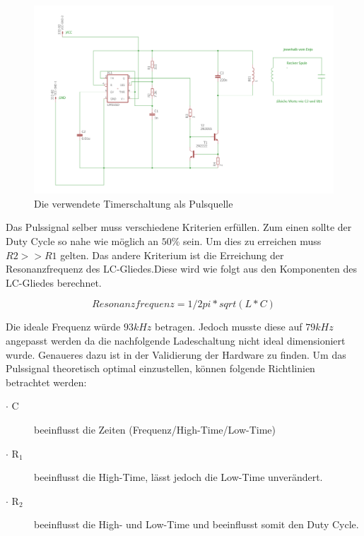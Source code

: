\begin{figure}[H]
	\begin{center}
		\includegraphics[width=\textwidth]{data/Tranceiver.png}
		\caption[Ne555]{Die verwendete Timerschaltung als Pulsquelle} %
		\label{fig:Tranceiver-Schaltung}
	\end{center}
\end{figure}
 
Das Pulssignal selber muss verschiedene Kriterien erfüllen. Zum einen sollte der Duty Cycle so nahe wie möglich an $50\%$ sein. Um dies zu erreichen muss $R2 >> R1$ gelten. Das andere Kriterium ist die Erreichung der Resonanzfrequenz des LC-Gliedes.Diese wird wie folgt aus den Komponenten des LC-Gliedes berechnet.

\begin{equation}\label{eq:Resonanz}
Resonanzfrequenz=1/2pi*sqrt(L*C)
\end{equation}

Die ideale Frequenz würde $93kHz$ betragen. Jedoch musste diese auf $79kHz$ angepasst werden da die nachfolgende Ladeschaltung nicht ideal dimensioniert wurde. Genaueres dazu ist in der Validierung der Hardware zu finden.
Um das Pulssignal theoretisch optimal einzustellen, können folgende Richtlinien betrachtet werden:
\begin{description}
	\item [$\cdot$ C] beeinflusst die Zeiten (Frequenz/High-Time/Low-Time)
	\item [$\cdot$ R$_{1}$] beeinflusst die High-Time, lässt jedoch die Low-Time unverändert.
	\item [$\cdot$ R$_{2}$ ] beeinflusst die High- und Low-Time und beeinflusst somit den Duty Cycle.
\end{description}


